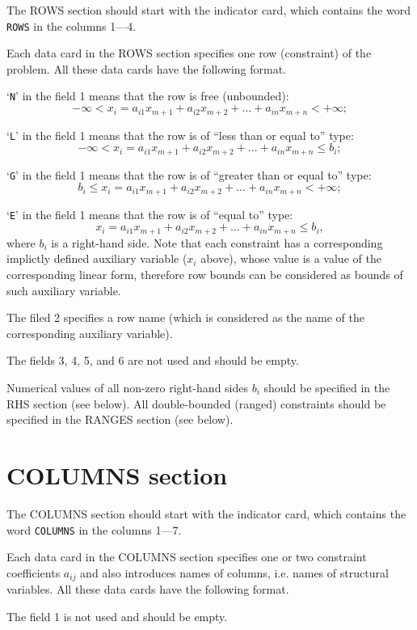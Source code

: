 The ROWS section should start with the indicator card, which contains
the word \verb|ROWS| in the columns 1---4.

Each data card in the ROWS section specifies one row (constraint) of
the problem. All these data cards have the following format.

`\verb|N|' in the field 1 means that the row is free (unbounded):
$$-\infty < x_i = a_{i1}x_{m+1} + a_{i2}x_{m+2} + \dots + a_{in}x_{m+n}
< +\infty;$$

`\verb|L|' in the field 1 means that the row is of ``less than or equal
to'' type:
$$-\infty < x_i = a_{i1}x_{m+1} + a_{i2}x_{m+2} + \dots + a_{in}x_{m+n}
\leq b_i;$$

`\verb|G|' in the field 1 means that the row is of ``greater than or
equal to'' type:
$$b_i \leq x_i = a_{i1}x_{m+1} + a_{i2}x_{m+2} + \dots + a_{in}x_{m+n}
< +\infty;$$

`\verb|E|' in the field 1 means that the row is of ``equal to'' type:
$$x_i = a_{i1}x_{m+1} + a_{i2}x_{m+2} + \dots + a_{in}x_{m+n} \leq
b_i,$$
where $b_i$ is a right-hand side. Note that each constraint has a
corresponding implictly defined auxiliary variable ($x_i$ above), whose
value is a value of the corresponding linear form, therefore row bounds
can be considered as bounds of such auxiliary variable.

The filed 2 specifies a row name (which is considered as the name of
the corresponding auxiliary variable).


The fields 3, 4, 5, and 6 are not used and should be empty.

Numerical values of all non-zero right-hand sides $b_i$ should be
specified in the RHS section (see below). All double-bounded (ranged)
constraints should be specified in the RANGES section (see below).

\section{COLUMNS section}

The COLUMNS section should start with the indicator card, which
contains the word \verb|COLUMNS| in the columns 1---7.

Each data card in the COLUMNS section specifies one or two constraint
coefficients $a_{ij}$ and also introduces names of columns, i.e. names
of structural variables. All these data cards have the following
format.

The field 1 is not used and should be empty.

